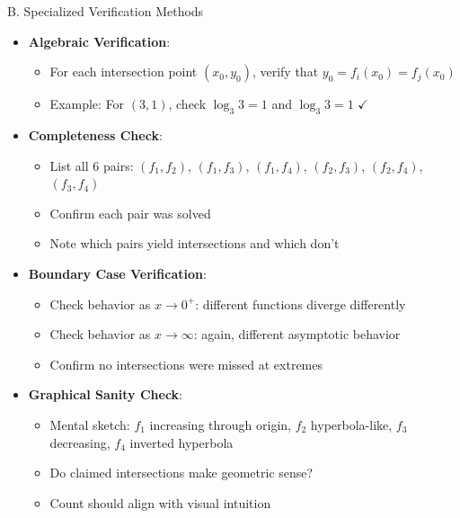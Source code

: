 \documentclass[12pt]{article}
\begin{document}
\begin{verificationbox}{B. Specialized Verification Methods}
\begin{itemize}[leftmargin=*]
    \item \textbf{Algebraic Verification}:
    \begin{itemize}
        \item For each intersection point $(x_0, y_0)$, verify that $y_0 = f_i(x_0) = f_j(x_0)$
        \item Example: For $(3, 1)$, check $\log_3 3 = 1$ and $\log_3 3 = 1$ $\checkmark$
    \end{itemize}
    
    \item \textbf{Completeness Check}:
    \begin{itemize}
        \item List all 6 pairs: $(f_1, f_2)$, $(f_1, f_3)$, $(f_1, f_4)$, $(f_2, f_3)$, $(f_2, f_4)$, $(f_3, f_4)$
        \item Confirm each pair was solved
        \item Note which pairs yield intersections and which don't
    \end{itemize}
    
    \item \textbf{Boundary Case Verification}:
    \begin{itemize}
        \item Check behavior as $x \to 0^+$: different functions diverge differently
        \item Check behavior as $x \to \infty$: again, different asymptotic behavior
        \item Confirm no intersections were missed at extremes
    \end{itemize}
    
    \item \textbf{Graphical Sanity Check}:
    \begin{itemize}
        \item Mental sketch: $f_1$ increasing through origin, $f_2$ hyperbola-like, $f_3$ decreasing, $f_4$ inverted hyperbola
        \item Do claimed intersections make geometric sense?
        \item Count should align with visual intuition
    \end{itemize}
\end{itemize}
\end{verificationbox}
\end{document}
